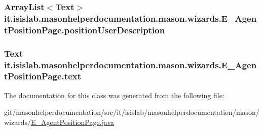 \hypertarget{classit_1_1isislab_1_1masonhelperdocumentation_1_1mason_1_1wizards_1_1_e___agent_position_page_af9f6fb6ec50925fea7b1bf932718c3af}{
\subsubsection[{position\-User\-Description}]{\setlength{\rightskip}{0pt plus 5cm}Array\-List$<$Text$>$ it.\-isislab.\-masonhelperdocumentation.\-mason.\-wizards.\-E\-\_\-\-Agent\-Position\-Page.\-position\-User\-Description\hspace{0.3cm}{\ttfamily [private]}}}\label{classit_1_1isislab_1_1masonhelperdocumentation_1_1mason_1_1wizards_1_1_e___agent_position_page_af9f6fb6ec50925fea7b1bf932718c3af}
\hypertarget{classit_1_1isislab_1_1masonhelperdocumentation_1_1mason_1_1wizards_1_1_e___agent_position_page_af6426f8de0e43846a74703addf28a63a}{
\subsubsection[{text}]{\setlength{\rightskip}{0pt plus 5cm}Text it.\-isislab.\-masonhelperdocumentation.\-mason.\-wizards.\-E\-\_\-\-Agent\-Position\-Page.\-text\hspace{0.3cm}{\ttfamily [private]}}}\label{classit_1_1isislab_1_1masonhelperdocumentation_1_1mason_1_1wizards_1_1_e___agent_position_page_af6426f8de0e43846a74703addf28a63a}


The documentation for this class was generated from the following file\-:\begin{DoxyCompactItemize}
\item 
git/masonhelperdocumentation/src/it/isislab/masonhelperdocumentation/mason/wizards/\hyperlink{_e___agent_position_page_8java}{E\-\_\-\-Agent\-Position\-Page.\-java}\end{DoxyCompactItemize}

